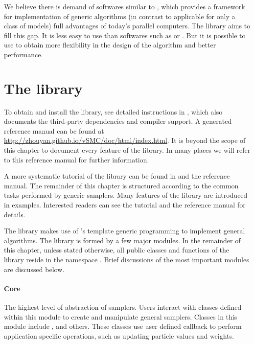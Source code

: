 We believe there is demand of softwares similar to \smctc, which provides a framework for implementation of generic \smc algorithms (in contrast to applicable for only a class of models)  full advantages of today's parallel computers. The \vsmc library aims to fill this gap. It is less easy to use than softwares such as \libbi or \biips. But it is possible to use  to obtain more flexibility in the design of the algorithm and better performance.

\section{The \protect\vsmc library}
\label{sec:The vSMC library}

To obtain and install the library, see detailed instructions in \cite{vsmcjss}, which also documents the third-party dependencies and compiler support. A \doxygen \cite{doxygen} generated reference manual can be found at \url{http://zhouyan.github.io/vSMC/doc/html/index.html}. It is beyond the scope of this chapter to document every feature of the \vsmc library. In many places we will refer to this reference manual for further information.

A more systematic tutorial of the library can be found in \cite{vsmcjss} and the reference manual. The remainder of this chapter is structured according to the common tasks performed by generic \smc samplers. Many features of the library are introduced in examples. Interested readers can see the tutorial \cite{vsmcjss} and the reference manual for details.

The \vsmc library makes use of \cpp's template generic programming to implement general \smc algorithms. The library is formed by a few major modules. In the remainder of this chapter, unless stated otherwise, all public classes and functions of the library reside in the namespace . Brief discussions of the most important modules are discussed below.

\paragraph{Core}

The highest level of abstraction of \smc samplers. Users interact with classes defined within this module to create and manipulate general \smc samplers. Classes in this module include ,  and others. These classes use user defined callback to perform application specific operations, such as updating particle values and weights.

